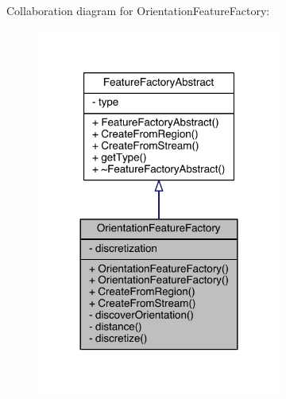 Collaboration diagram for Orientation\+Feature\+Factory\+:
\nopagebreak
\begin{figure}[H]
\begin{center}
\leavevmode
\includegraphics[width=228pt]{class_orientation_feature_factory__coll__graph}
\end{center}
\end{figure}


